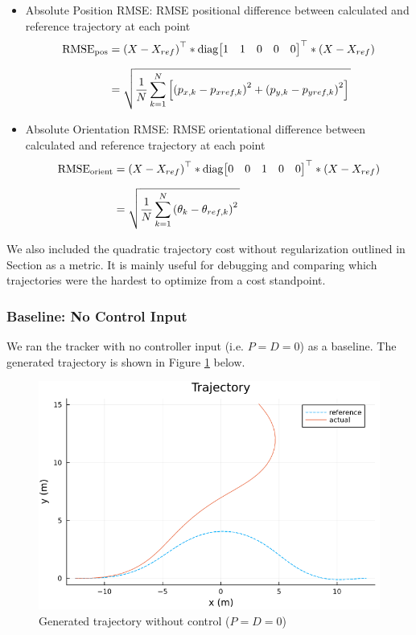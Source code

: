 \documentclass[11pt]{article}
\begin{document}
    \begin{itemize}
        \item Absolute Position RMSE: RMSE positional difference between calculated and reference trajectory at each point \begin{align*}
            \mathrm{RMSE}_{\mathrm{pos}} &= \transp{X - X_{ref}} * \mathrm{diag}\transbmat{1 & 1 & 0 & 0 & 0} * \left(X - X_{ref}\right) \fracln
            &= \sqrt{\strut \dfrac{1}{N} \sum^N_{k=1} \left[\left(p_{x,k} - p_{xref, k}\right)^2 + \left(p_{y,k} - p_{yref, k}\right)^2\right]  \strut\strut }
        \end{align*}
        \item Absolute Orientation RMSE: RMSE orientational difference between calculated and reference trajectory at each point\begin{align*}
            \mathrm{RMSE}_{\mathrm{orient}} &= \transp{X - X_{ref}} *  \mathrm{diag}\transbmat{0 & 0 & 1 & 0 & 0} * \left(X - X_{ref}\right) \fracln
            &= \sqrt{\strut \dfrac{1}{N} \sum^N_{k=1} \left(\theta_{k} - \theta_{ref, k}\right)^2 \strut\strut }
        \end{align*}
    \end{itemize}
    
    We also included the quadratic trajectory cost without regularization outlined in Section as a metric. It is mainly useful for debugging and comparing which trajectories were the hardest to optimize from a cost standpoint.

    \def\quadcost{\ensuremath{\mathcal{L}_Q}}
    \def\rmsepos{\ensuremath{\mathrm{RMSE}_{\mathrm{pos}}}}
    \def\rmseorient{\ensuremath{\mathrm{RMSE}_{\mathrm{orient}}}}

    \subsubsection{Baseline: No Control Input}
    We ran the tracker with no controller input (i.e. $P = D = 0$) as a baseline. The generated trajectory is shown in Figure \ref{fig:trajectorynocontrol} below.
    
    \begin{figure}[h!]
        \centering
        \includegraphics[width=0.55\linewidth]{img/trajectory_nocontrol}
        \caption{Generated trajectory without control ($ P = D = 0$)}
        \label{fig:trajectorynocontrol}
    \end{figure}
\end{document}
